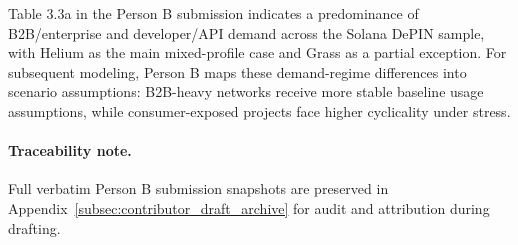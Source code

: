 Table 3.3a in the Person B submission indicates a predominance of B2B/enterprise and developer/API demand across the Solana DePIN sample, with Helium as the main mixed-profile case and Grass as a partial exception. For subsequent modeling, Person B maps these demand-regime differences into scenario assumptions: B2B-heavy networks receive more stable baseline usage assumptions, while consumer-exposed projects face higher cyclicality under stress.

\paragraph{Traceability note.} Full verbatim Person B submission snapshots are preserved in Appendix~\ref{subsec:contributor_draft_archive} for audit and attribution during drafting.
